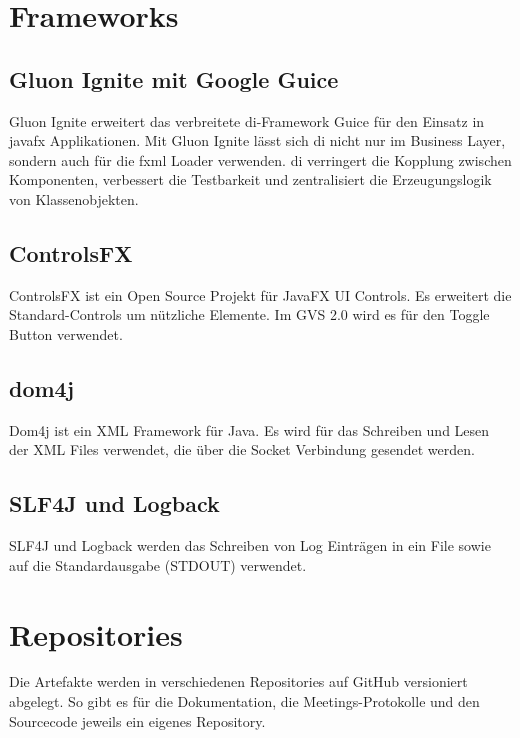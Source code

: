 \documentclass[11pt,a4paper,english,oneside]{book}
\numberwithin{equation}{chapter}
\begin{document}
	
	
	\section{Frameworks}
	
	\subsection{Gluon Ignite mit Google Guice} \label{DI}
	Gluon Ignite \cite{gluonignite} erweitert das verbreitete \gls{di}-Framework Guice \cite{guice} für den Einsatz in \gls{javafx} Applikationen. Mit Gluon Ignite lässt sich \gls{di} nicht nur im Business Layer, sondern auch für die \gls{fxml} Loader verwenden. \gls{di} verringert die Kopplung zwischen Komponenten, verbessert die Testbarkeit und zentralisiert die Erzeugungslogik von Klassenobjekten.
	
	\subsection{ControlsFX}
	ControlsFX \cite{controlsfx} ist ein Open Source Projekt für JavaFX UI Controls. Es erweitert die Standard-Controls um nützliche Elemente. Im GVS 2.0 wird es für den Toggle Button verwendet. 
	
	\subsection{dom4j}
	Dom4j \cite{dom4j} ist ein XML Framework für Java. Es wird für das Schreiben und Lesen der XML Files verwendet, die über die Socket Verbindung gesendet werden.
	
	\subsection{SLF4J und Logback}
	SLF4J \cite{slf4j} und Logback \cite{logback} werden das Schreiben von Log Einträgen in ein File sowie auf die Standardausgabe (STDOUT) verwendet.
	
		
		
	\section{Repositories}
	Die Artefakte werden in verschiedenen Repositories auf GitHub versioniert abgelegt. So gibt es für die Dokumentation, die Meetings-Protokolle und den Sourcecode jeweils ein eigenes Repository.
	
\end{document}
